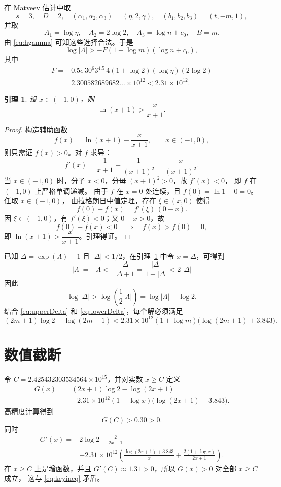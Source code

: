 \documentclass[11pt,a4paper]{ctexart}
\newtheorem{lemma}[theorem]{引理}
\theoremstyle{remark}
\begin{document}
在 Matveev 估计中取
\[ s=3,\quad D=2,\quad
(\alpha_1,\alpha_2,\alpha_3)=(\eta,2,\gamma),\quad (b_1,b_2,b_3)=(t,-m,1), \]
并取
\[ A_1=\log\eta,\quad A_2=2\log2,\quad A_3=\log n+c_0,\quad B=m. \]
由 \eqref{eq:hgamma} 可知这些选择合法。于是
\begin{equation}\label{eq:lowerDelta}
\log|\Lambda|> -F(1+\log m)(\log n+c_0),
\end{equation}
其中
\begin{align*}
F={}&0.5e\,30^6 3^{4.5}\,4(1+\log2) (\log\eta)(2\log2)\\
={}&2.300582689682\ldots\times10^{12}
<2.31\times10^{12}.
\end{align*}

\begin{lemma}\label{lem:log-ineq}
设 $x\in(-1, 0)$，则
\[ \ln(x+1)>\frac{x}{x+1}. \]
\end{lemma}

\begin{proof}
构造辅助函数
\[ f(x)=\ln(x+1)-\frac{x}{x+1},\qquad x\in(-1,0), \]
则只需证 $f(x)>0$。对 $f$ 求导：
\[ f'(x)=\frac{1}{x+1}-\frac{1}{(x+1)^2}=\frac{x}{(x+1)^2}. \]
当 $x\in(-1,0)$ 时，分子 $x<0$，分母 $(x+1)^2>0$，故 $f'(x)<0$，
即 $f$ 在 $(-1,0)$ 上严格单调递减。
由于 $f$ 在 $x=0$ 处连续，且 $f(0)=\ln 1-0=0$。任取 $x\in(-1,0)$，
由拉格朗日中值定理，存在 $\xi\in(x,0)$ 使得
\[ f(0)-f(x)=f'(\xi)\,(0-x). \]
因 $\xi\in(-1,0)$，有 $f'(\xi)<0$；又 $0-x>0$，故
\[ f(0)-f(x)<0 \quad\Longrightarrow\quad f(x)>f(0)=0, \]
即 $\ln(x+1)>\dfrac{x}{x+1}$。引理得证。
\end{proof}

已知 \(\Delta=\exp(\Lambda)-1\) 且 \(|\Delta|<1/2\)，在引理~\ref{lem:log-ineq} 中令 $x=\Delta$，可得到
\[ |\Lambda|=-\Lambda<-\frac{\Delta}{\Delta+1}=\frac{|\Delta|}{1-|\Delta|}<2\,|\Delta| \]
因此
\[ \log|\Delta| > \log\left(\frac{1}{2}|\Lambda|\right) = \log|\Lambda| - \log 2. \]
结合 \eqref{eq:upperDelta} 和 \eqref{eq:lowerDelta}，每个解必须满足
\begin{equation}\label{eq:keyineq}
(2m+1)\log2-\log(2m+1)
<2.31\times10^{12}(1+\log m)
\bigl(\log(2m+1)+3.843\bigr).
\end{equation}

\section{数值截断}
令 \(C=2.425432303534564\times10^{15}\)，并对实数 \(x\ge C\) 定义
\begin{align*}
G(x)={}&(2x+1)\log2-\log(2x+1)\\
&-2.31\times10^{12}(1+\log x)
\bigl(\log(2x+1)+3.843\bigr).
\end{align*}
高精度计算得到
\[ G(C)>0.30>0. \]
同时
\begin{align*}
G'(x)={}&2\log2-\frac2{2x+1}\\
&-2.31\times10^{12}\left(
\frac{\log(2x+1)+3.843}{x}
+\frac{2(1+\log x)}{2x+1}\right).
\end{align*}
在 $x\geq C$ 上是增函数，并且 $G'(C)\approx 1.31 >0$，所以 \(G(x)>0\) 对全部 \(x\ge C\) 成立，
这与 \eqref{eq:keyineq} 矛盾。
\end{document}
